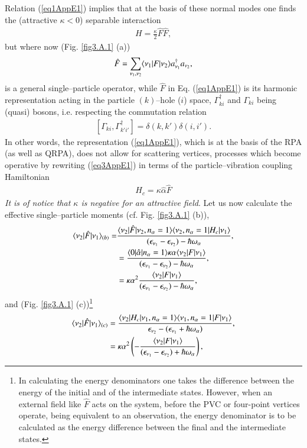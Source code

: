Relation (\ref{eq1AppE1}) implies that at the basis of these normal modes one finds the (attractive $\kappa<0$) separable interaction 
\begin{align}\label{eq3AppE1}
H=\frac{\kappa}{2}\hat F\hat F,
\end{align}
but where now (Fig. \ref{fig3.A.1} (a))
\begin{align}
\hat F=\sum_{\nu_1,\nu_2} \langle {\nu_1|F|\nu_2} \rangle a^\dagger_{\nu_1}a_{\nu_2},
\end{align}
is a general single--particle operator, while $\hat F$ in  Eq. (\ref{eq1AppE1}) is its harmonic representation acting in the particle $(k)$--hole ($i$) space, $\Gamma^\dagger_{ki}$ and $\Gamma_{ki}$ being (quasi) bosons, i.e. respecting the commutation relation 
\begin{align}
\left[\Gamma_{ki},\Gamma^\dagger_{k'i'}\right]=\delta(k,k')\delta(i,i').
\end{align}
In other words, the representation (\ref{eq1AppE1}), which is at the basis of the RPA (as well as QRPA), does not allow for scattering vertices, processes which become operative by rewriting (\ref{eq3AppE1}) in terms of the particle--vibration coupling Hamiltonian
\begin{align}\label{eq3AppE4}
H_c=\kappa\hat \alpha\hat F
\end{align}
\emph{It is of notice that $\kappa$ is negative for an attractive field}. Let us now calculate the effective single--particle moments (cf. Fig. \ref{fig3.A.1} (b)),
\begin{align}
\nonumber \langle {\nu_2|\hat F|\nu_1} \rangle_{(b)}=&\frac{\langle {\nu_2|\hat F|\nu_2,n_\alpha=1} \rangle\langle {\nu_2,n_\alpha=1|H_c|\nu_1} \rangle}{(\epsilon_{\nu_1}-\epsilon_{\nu_2})-\hbar\omega_\alpha},\\
\nonumber &=\frac{\langle {0|\hat \alpha|n_\alpha=1} \rangle\kappa\alpha \langle {\nu_2|F|\nu_1} \rangle}{(\epsilon_{\nu_1}-\epsilon_{\nu_2})-\hbar\omega_\alpha},\\
&=\kappa\alpha^2\frac{ \langle {\nu_2|F|\nu_1} \rangle}{(\epsilon_{\nu_1}-\epsilon_{\nu_2})-\hbar\omega_\alpha},
\end{align}
and (Fig. \ref{fig3.A.1} (c))\footnote{In calculating the energy denominators one takes the difference between the energy of the initial and of the intermediate states. However, when an external field like $\hat F$ acts on the system, before the PVC or four-point vertices operate, being equivalent to an observation, the energy denominator is to be calculated as the energy difference between the final and the intermediate states. }
\begin{align}\label{eq8App1E}
\nonumber \langle {\nu_2|\hat F|\nu_1} \rangle_{(c)}&=\frac{\langle {\nu_2|H_c|\nu_1,n_\alpha=1} \rangle\langle {\nu_1,n_\alpha=1| F|\nu_1} \rangle}{\epsilon_{\nu_2}-(\epsilon_{\nu_1}+\hbar\omega_\alpha)},\\
&=\kappa\alpha^2\left(-\frac{\langle {\nu_2|F|\nu_1} \rangle}{(\epsilon_{\nu_1}-\epsilon_{\nu_2})+\hbar\omega_\alpha}\right),
\end{align}
